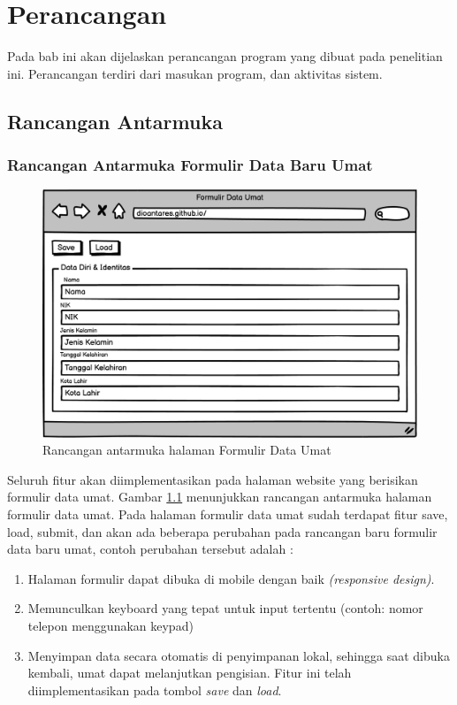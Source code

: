 \chapter{Perancangan}
\label{chap:perancangan}

Pada bab ini akan dijelaskan perancangan program yang dibuat pada penelitian ini. Perancangan terdiri dari masukan program, dan aktivitas sistem.

\section{Rancangan Antarmuka}
\label{sec:rancanganAntarmuka}

\subsection{Rancangan Antarmuka Formulir Data Baru Umat}
\label{sec:subRancanganAntarmuka}

\begin{figure}[H]
	\centering
	\includegraphics[scale=0.7]{Gambar/mockUpWebsite.png}
	\caption{Rancangan antarmuka halaman Formulir Data Umat} 
	\label{fig:formDataUmat}
\end{figure}

Seluruh fitur akan diimplementasikan pada halaman website yang berisikan formulir data umat. Gambar \ref{fig:formDataUmat} menunjukkan rancangan antarmuka halaman formulir data umat. Pada halaman formulir data umat sudah terdapat fitur save, load, submit, dan akan ada  beberapa perubahan pada rancangan baru formulir data baru umat, contoh perubahan tersebut adalah : 

\begin{enumerate}
	\item Halaman formulir dapat dibuka di mobile dengan baik \textit{(responsive design)}.
	\item Memunculkan keyboard yang tepat untuk input tertentu (contoh: nomor telepon menggunakan keypad)
	\item Menyimpan data secara otomatis di penyimpanan lokal, sehingga saat dibuka kembali, umat dapat melanjutkan pengisian. Fitur ini telah diimplementasikan pada tombol \textit{save} dan \textit{load}.
\end{enumerate}

